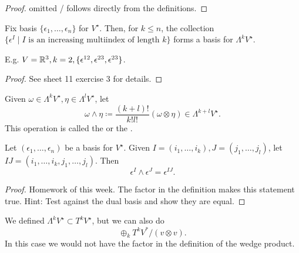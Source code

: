 \begin{proof}
    omitted / follows directly from the definitions.
\end{proof}

\begin{lemma}\label{lem:10.7}
    Fix basis \(\{\epsilon_1,\dots,\epsilon_n\}\) for \(V^\star\). Then, for
    \(k\leq n\), the collection \(\{\epsilon^I\mid I \text{ is an increasing multiindex of length } k\}\) forms a basis for \(\Lambda^k V^\star\). 
\end{lemma}

E.g. \(V=\mathbb{R}^3,k=2,\{\epsilon^{12},\epsilon^{23},\epsilon^{23}\}\).

\begin{proof}
    See sheet 11 exercise 3 for details.
\end{proof}

\begin{definition*}
    Given \(\omega\in \Lambda^k V^\star,\eta\in \Lambda^l V^\star\), let 
    \[\omega \wedge \eta\coloneqq \frac{(k+l)!}{k!l!}(\omega\otimes \eta)\in \Lambda^{k+l}V^\star.\]
    This operation is called the  or the .
\end{definition*}

\begin{lemma}\label{lem:10.8}
    Let \((\epsilon_1,\dots,\epsilon_n)\) be a basis for \(V^\star\). Given 
    \(I=(i_1,\dots,i_k),J=(j_1,\dots,j_l)\), let \(IJ=(i_1,\dots,i_k,j_1,\dots,j_l)\).
    Then \[\epsilon^I\wedge \epsilon^J=\epsilon^{IJ}.\]
\end{lemma}

\begin{proof}
    Homework of this week. The factor in the definition makes this statement true. Hint: Test against the dual basis
    and show they are equal.
\end{proof}

\begin{remark}
    We defined \(\Lambda^k V^\star\subset T^k V^\star\), but we can also do \[\oplus_k T^k V^*/(v\otimes v).\]
    In this case we would not have the factor in the definition of the wedge product.
\end{remark}

